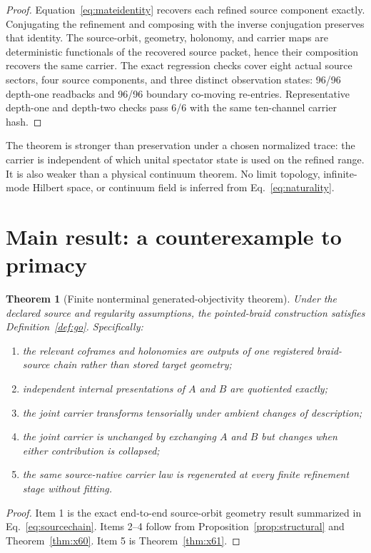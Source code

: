 \documentclass[11pt]{article}
\newtheorem{theorem}{Theorem}[section]
\theoremstyle{definition}
\theoremstyle{remark}
\begin{document}
\begin{proof}
Equation~\eqref{eq:mateidentity} recovers each refined source component exactly. Conjugating the refinement and composing with the inverse conjugation preserves that identity. The source-orbit, geometry, holonomy, and carrier maps are deterministic functionals of the recovered source packet, hence their composition recovers the same carrier. The exact regression checks cover eight actual source sectors, four source components, and three distinct observation states: 96/96 depth-one readbacks and 96/96 boundary co-moving re-entries. Representative depth-one and depth-two checks pass 6/6 with the same ten-channel carrier hash.
\end{proof}

The theorem is stronger than preservation under a chosen normalized trace: the carrier is independent of which unital spectator state is used on the refined range. It is also weaker than a physical continuum theorem. No limit topology, infinite-mode Hilbert space, or continuum field is inferred from Eq.~\eqref{eq:naturality}.

\section{Main result: a counterexample to primacy}

\begin{theorem}[Finite nonterminal generated-objectivity theorem]\label{thm:main}
Under the declared source and regularity assumptions, the pointed-braid construction satisfies Definition~\ref{def:go}. Specifically:
\begin{enumerate}
\item the relevant coframes and holonomies are outputs of one registered braid-source chain rather than stored target geometry;
\item independent internal presentations of $A$ and $B$ are quotiented exactly;
\item the joint carrier transforms tensorially under ambient changes of description;
\item the joint carrier is unchanged by exchanging $A$ and $B$ but changes when either contribution is collapsed;
\item the same source-native carrier law is regenerated at every finite refinement stage without fitting.
\end{enumerate}
\end{theorem}

\begin{proof}
Item 1 is the exact end-to-end source-orbit geometry result summarized in Eq.~\eqref{eq:sourcechain}. Items 2--4 follow from Proposition~\ref{prop:structural} and Theorem~\ref{thm:x60}. Item 5 is Theorem~\ref{thm:x61}.
\end{proof}
\end{document}
